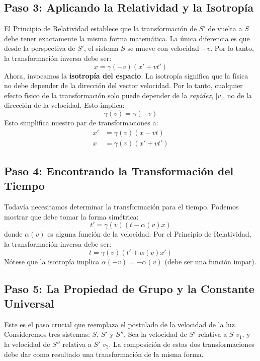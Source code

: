 \documentclass[11pt,a4paper]{article}
\begin{document}
\subsection{Paso 3: Aplicando la Relatividad y la Isotropía}
El Principio de Relatividad establece que la transformación de $S'$ de vuelta a $S$ debe tener exactamente la misma forma matemática. La única diferencia es que desde la perspectiva de $S'$, el sistema $S$ se mueve con velocidad $-v$. Por lo tanto, la transformación inversa debe ser:
\begin{equation} \label{eq:x}
x = \gamma(-v)(x' + vt')
\end{equation}
Ahora, invocamos la \textbf{isotropía del espacio}. La isotropía significa que la física no debe depender de la dirección del vector velocidad. Por lo tanto, cualquier efecto físico de la transformación solo puede depender de la \textit{rapidez}, $|v|$, no de la dirección de la velocidad. Esto implica:
\[ \gamma(v) = \gamma(-v) \]
Esto simplifica nuestro par de transformaciones a:
\begin{align*}
x' &= \gamma(v)(x - vt) \\
x &= \gamma(v)(x' + vt')
\end{align*}

\subsection{Paso 4: Encontrando la Transformación del Tiempo}
Todavía necesitamos determinar la transformación para el tiempo. Podemos mostrar que debe tomar la forma simétrica:
\begin{equation} \label{eq:t_prime}
t' = \gamma(v)(t - \alpha(v) x)
\end{equation}
donde $\alpha(v)$ es alguna función de la velocidad. Por el Principio de Relatividad, la transformación inversa debe ser:
\begin{equation} \label{eq:t}
t = \gamma(v)(t' + \alpha(v) x')
\end{equation}
Nótese que la isotropía implica $\alpha(-v) = -\alpha(v)$ (debe ser una función impar).

\subsection{Paso 5: La Propiedad de Grupo y la Constante Universal}
Este es el paso crucial que reemplaza el postulado de la velocidad de la luz. Consideremos tres sistemas: $S$, $S'$ y $S''$. Sea la velocidad de $S'$ relativa a $S$ $v_1$, y la velocidad de $S''$ relativa a $S'$ $v_2$. La composición de estas dos transformaciones debe dar como resultado una transformación de la misma forma.
\end{document}
